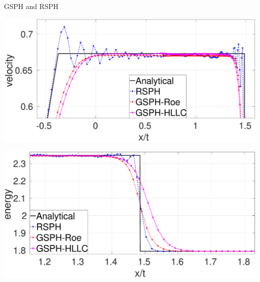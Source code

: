 \documentclass{beamer}
\begin{document}
\begin{frame}{GSPH and RSPH}
\begin{figure}[t]
\begin{minipage}{.33\textwidth}
    \end{minipage}%
\end{figure}

	\begin{minipage}[b][][c]{.24 \textwidth}
		\centering
        \includegraphics[width=0.90 \textwidth]{./Chapter-4/Figures/Sod/RCM-Sod-GSPH-compare-v-zoom}
    \end{minipage}%
    \begin{minipage}[b][][c]{.24 \textwidth}
    		\centering
        \includegraphics[width=0.90 \textwidth]{./Chapter-4/Figures/Sod/RCM-Sod-GSPH-compare-e-zoom}
    \end{minipage}%
	\begin{minipage}[b][][b]{.25 \textwidth}

\end{minipage}
\end{frame}
\end{document}
